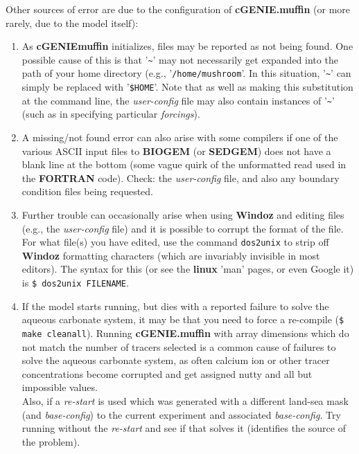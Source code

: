 \documentclass[11pt,fleqn]{book} %
\begin{document}
\noindent Other sources of error are due to the configuration of \textbf{cGENIE.muffin} (or more rarely, due to the model itself):
                
\vspace{1mm}
\begin{enumerate}

\vspace{1mm}
\item As \textbf{cGENIEmuffin} initializes, files may be reported as not being found. One possible cause of this is that '\texttt{\~{}}' may not necessarily get expanded into the path of your home directory (e.g., '\texttt{/home/mushroom}'. In this situation, '\texttt{\~{}}' can simply be replaced with '\texttt{\$HOME}'. Note that as well as making this substitution at the command line, the \textit{user-config} file may also contain instances of '\texttt{\~{}}' (such as in specifying particular \textit{forcings}).
        
\vspace{1mm}
\item A missing/not found error can also arise with some compilers if one of the various ASCII input files to \textbf{BIOGEM} (or \textbf{SEDGEM}) does not have a blank line at the bottom (some vague quirk of the unformatted read used in the \textbf{FORTRAN} code). Check: the \textit{user-config} file, and also any boundary condition files being requested.
        
\vspace{1mm}
\item Further trouble can occasionally arise when using \textbf{Windoz} and editing files (e.g., the \textit{user-config} file) and it is possible to corrupt the format of the file. For what file(s) you have edited, use the command \texttt{dos2unix} to strip off \textbf{Windoz} formatting characters (which are invariably invisible in most editors). The syntax for this (or see the \textbf{linux} 'man' pages, or even Google it) is \texttt{\$ dos2unix FILENAME}.
        
\vspace{1mm}
\item If the model starts running, but dies with a reported failure to solve the aqueous carbonate system, it may be that you need to force a re-compile (\texttt{\$ make cleanall}). Running \textbf{cGENIE.muffin} with array dimensions which do not match the number of tracers selected is a common cause of failures to solve the aqueous carbonate system, as often calcium ion or other tracer concentrations become corrupted and get assigned nutty and all but impossible values.
\\Also, if a \textit{re-start} is used which was generated with a different land-sea mask (and \textit{base-config}) to the current experiment and associated \textit{base-config}. Try running without the \textit{re-start} and see if that solves it (identifies the source of the problem).

\end{enumerate}
\vspace{2mm}
\end{document}
